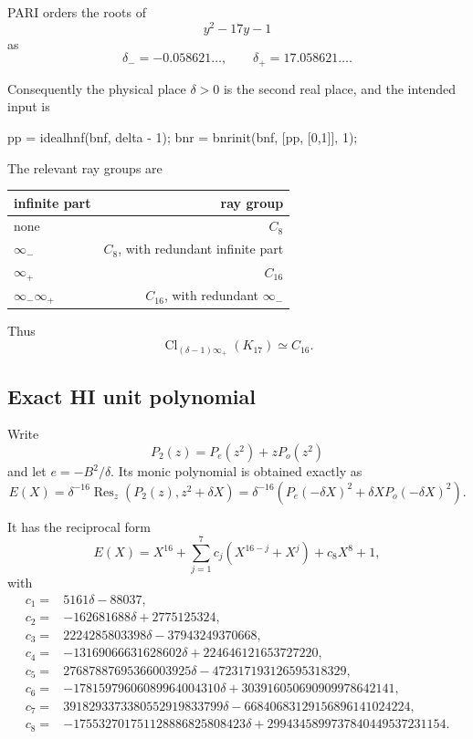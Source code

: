 \documentclass[11pt,reqno]{amsart}
\theoremstyle{plain}
\begin{document}
PARI orders the roots of
\[
y^2-17y-1
\]
as
\[
\delta_-=-0.058621\ldots,
\qquad
\delta_+=17.058621\ldots.
\]

Consequently the physical place \(\delta>0\) is the second real place, and the intended input is

\begin{code}
pp  = idealhnf(bnf, delta - 1);
bnr = bnrinit(bnf, [pp, [0,1]], 1);
\end{code}

The relevant ray groups are

\begin{center}\small
\begin{tabular}{@{}lr@{}}
\toprule
infinite part & ray group \\
\midrule
none & \(C_8\) \\
\(\infty_-\) & \(C_8\), with redundant infinite part \\
\(\infty_+\) & \(C_{16}\) \\
\(\infty_-\infty_+\) & \(C_{16}\), with redundant \(\infty_-\) \\
\bottomrule
\end{tabular}
\end{center}

Thus
\[
\operatorname{Cl}_{(\delta-1)\infty_+}(K_{17})\simeq C_{16}.
\]

\subsection{Exact HI unit polynomial}\label{sec:21.2}

Write
\[
P_2(z)=P_e(z^2)+zP_o(z^2)
\]
and let \(e=-B^2/\delta\). Its monic polynomial is obtained exactly as
\[
E(X)
=
\delta^{-16}\operatorname{Res}_z(P_2(z),z^2+\delta X)
=
\delta^{-16}
\left(P_e(-\delta X)^2+\delta X P_o(-\delta X)^2\right).
\]

It has the reciprocal form
\[
E(X)=X^{16}+\sum_{j=1}^7 c_j(X^{16-j}+X^j)+c_8X^8+1,
\]
with
\[
\begin{aligned}
c_1={}&5161\delta-88037,\\
c_2={}&-162681688\delta+2775125324,\\
c_3={}&2224285803398\delta-37943249370668,\\
c_4={}&-13169066631628602\delta+224646121653727220,\\
c_5={}&27687887695366003925\delta-472317193126595318329,\\
c_6={}&-17815979606089964004310\delta+303916050690909978642141,\\
c_7={}&3918293373380552919833799\delta-66840683129156896141024224,\\
c_8={}&-175532701751128886825808423\delta
       +2994345899737840449537231154.
\end{aligned}
\]
\end{document}
